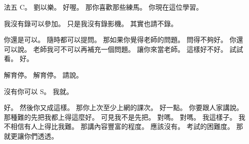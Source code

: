 \hypertarget{c01:cue:2072}{}法五 C。
\hypertarget{c01:cue:2073}{}劉以樂。
\hypertarget{c01:cue:2074}{}好喔。
\hypertarget{c01:cue:2075}{}那你喜歡那些練馬。
\hypertarget{c01:cue:2076}{}你現在這位學習。

\hypertarget{c01:cue:2077}{}我沒有錄可以參加。
\hypertarget{c01:cue:2078}{}只是我沒有錄影機。
\hypertarget{c01:cue:2079}{}其實也請不錄。

\hypertarget{c01:cue:2080}{}你還是可以。
\hypertarget{c01:cue:2081}{}隨時都可以提問。
\hypertarget{c01:cue:2082}{}那如果你覺得老師的問題。
\hypertarget{c01:cue:2083}{}問得不夠好。
\hypertarget{c01:cue:2084}{}你還可以說。
\hypertarget{c01:cue:2085}{}老師我可不可以再補充一個問題。
\hypertarget{c01:cue:2086}{}讓你來當老師。
\hypertarget{c01:cue:2087}{}這樣好不好。
\hypertarget{c01:cue:2088}{}試試看。
\hypertarget{c01:cue:2089}{}好。

\hypertarget{c01:cue:2090}{}解育停。
\hypertarget{c01:cue:2091}{}解育停。
\hypertarget{c01:cue:2092}{}請說。

\hypertarget{c01:cue:2093}{}沒有你可以 S。
\hypertarget{c01:cue:2094}{}我就。

\hypertarget{c01:cue:2095}{}好。
\hypertarget{c01:cue:2096}{}然後你又成這樣。
\hypertarget{c01:cue:2097}{}那你上次至少上網的課次。
\hypertarget{c01:cue:2098}{}好一點。
\hypertarget{c01:cue:2099}{}你要跟人家講說。
\hypertarget{c01:cue:2100}{}那種難的先把我都上得這麼好。
\hypertarget{c01:cue:2101}{}可見我不是先把。
\hypertarget{c01:cue:2102}{}對嗎。
\hypertarget{c01:cue:2103}{}對嗎。
\hypertarget{c01:cue:2104}{}我這樣子。
\hypertarget{c01:cue:2105}{}我不相信有人上得比我難。
\hypertarget{c01:cue:2106}{}那講內容豐富的程度。
\hypertarget{c01:cue:2107}{}應該沒有。
\hypertarget{c01:cue:2108}{}考試的困難度。
\hypertarget{c01:cue:2109}{}那就更讓你們透透。


